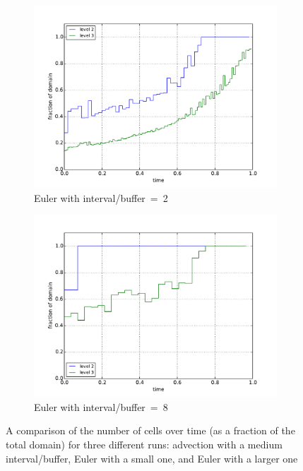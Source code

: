\documentclass[11pt]{article}
\begin{document}
\begin{figure}[!htb]
	\begin{subfigure}[b]{0.45\textwidth}
		\caption{Euler with interval/buffer~=~2}
		\includegraphics[width=\textwidth]{myclaw/cells_euler_2}
	\end{subfigure}	
	\begin{subfigure}[b]{0.45\textwidth}
		\caption{Euler with interval/buffer~=~8}
		\includegraphics[width=\textwidth]{myclaw/cells_euler_8}
	\end{subfigure}
	\caption{A comparison of the number of cells over time (as a fraction
	of the total domain) for three different runs: advection with a medium
	interval/buffer, Euler with a small one, and Euler with a larger one}
	\label{fig:cells_over_time}
\end{figure}
\end{document}
